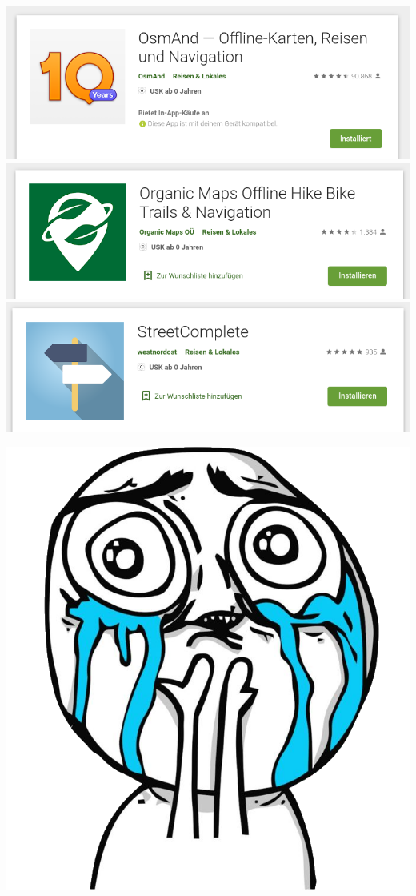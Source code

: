 \documentclass{beamer}
\begin{document}
	\begin{frame}
		\vfill
		\begin{center}
			\includegraphics[width=0.7\linewidth]{images/osmand-playstore}\\
			\vspace{0.25cm}
			\includegraphics[width=0.7\linewidth]{images/organic-maps-playstore}\\
			\vspace{0.25cm}
			\includegraphics[width=0.7\linewidth]{images/osm-sc-playstore}
		\end{center}
		\vfill
	\end{frame}

	\begin{frame}
		\begin{center}
			\includegraphics[width=0.5\linewidth]{images/happy-meme-2}
		\end{center}
	\end{frame}
\end{document}
